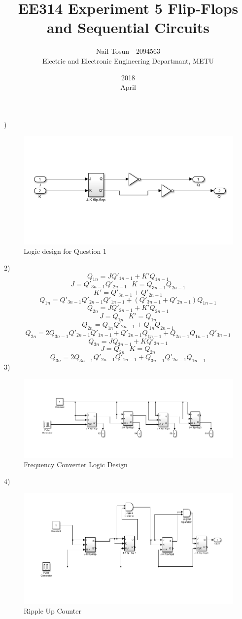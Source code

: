 \documentclass[11pt]{report}
\title{EE314 Experiment 5 Flip-Flops and Sequential Circuits}
\date{2018\\ April}
\author{Nail Tosun - 2094563\\ Electric and Electronic Engineering Departmant, METU}
\begin{document}
)
\begin{figure}[H]
  \includegraphics[width=\linewidth]{1}
  \caption{Logic design for Question 1}
  \label{fig:zero}
\end{figure}
2)\[Q_{1n}=JQ'_{1n-1}+K'Q_{1n-1}\]
\[J=Q'_{3n-1}Q'_{2n-1} \>\>\> K=Q_{3n-1}Q_{2n-1} \]
\[K'=Q'_{3n-1}+Q'_{2n-1}\]
\[Q_{1n}=Q'_{3n-1}Q'_{2n-1}Q'_{1n-1}+(Q'_{3n-1}+Q'_{2n-1})Q_{1n-1}\]
\[Q_{2n}=JQ'_{2n-1}+K'Q_{2n-1}\]
\[J=Q_{1n} \>\>\> K'=Q_{1n}\]
\[Q_{2n}=Q_{1n}Q'_{2n-1}+Q_{1n}Q_{2n-1}\]
\[Q_{2n}=2Q_{3n-1}Q'_{2n-1}Q'_{1n-1}+Q'_{2n-1}Q_{1n-1}+Q_{2n-1}Q_{1n-1}Q'_{3n-1}\]
\[Q_{3n}=JQ_{3n-1}+KQ'_{3n-1}\]
\[J=Q_{2n} \>\>\> K=Q_{2n}\]
\[Q_{3n}=2Q_{3n-1}Q'_{2n-1}Q'_{1n-1}+Q_{3n-1}Q'_{2n-1}Q_{1n-1}\]
3)
\begin{figure}[H]
  \includegraphics[width=\linewidth]{frequecy}
  \caption{Frequency Converter Logic Design}
  \label{fig:zero}
\end{figure}
4)
\begin{figure}[H]
  \includegraphics[width=\linewidth]{upcounter}
  \caption{Ripple Up Counter}
  \label{fig:zero}
\end{figure}
\end{document}
